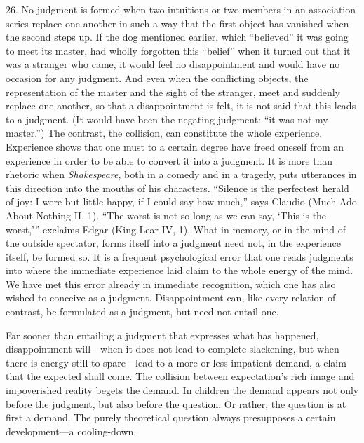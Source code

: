 \documentclass[12pt,a4paper]{book}
\newcommand{\opage}[1]{\marginnote{\footnotesize\textit{[#1]}}}
\begin{document}
26. No judgment is formed when two intuitions or two members in an
association-series replace one another in such a way that the first object
has vanished when the second steps up. If the dog mentioned earlier,
which ``believed'' it was going to meet its master, had wholly forgotten
this ``belief'' when it turned out that it was a stranger who came, it
would feel no disappointment and would have no occasion for any judgment.
And even when the conflicting objects, the representation of the master
and the sight of the stranger, meet and suddenly replace one another, so
that a disappointment is felt, it is not said that this leads to a
judgment. (It would have been the negating judgment: ``it was not my
master.'') The contrast, the collision, can constitute the whole
experience. Experience shows that one must to a certain degree have freed
oneself from an experience in order to be able to convert it into a
judgment. It is more than rhetoric when \emph{Shakespeare}, both in a
comedy and in a tragedy, puts utterances in this direction into the
mouths of his characters. ``Silence is the perfectest \opage{75}herald of joy: I
were but little happy, if I could say how much,'' says Claudio (Much Ado
About Nothing II, 1). ``The worst is not so long as we can say, `This is
the worst,''' exclaims Edgar (King Lear IV, 1). What in memory, or in the
mind of the outside spectator, forms itself into a judgment need not, in
the experience itself, be formed so. It is a frequent psychological error
that one reads judgments into where the immediate experience laid claim
to the whole energy of the mind. We have met this error already in
immediate recognition, which one has also wished to conceive as a
judgment. Disappointment can, like every relation of contrast, be
formulated as a judgment, but need not entail one.

Far sooner than entailing a judgment that expresses what has happened,
disappointment will---when it does not lead to complete slackening, but
when there is energy still to spare---lead to a more or less impatient
demand, a claim that the expected shall come. The collision between
expectation's rich image and impoverished reality begets the demand. In
children the demand appears not only before the judgment, but also before
the question. Or rather, the question is at first a demand. The purely
theoretical question always presupposes a certain development---a
cooling-down.
\end{document}
